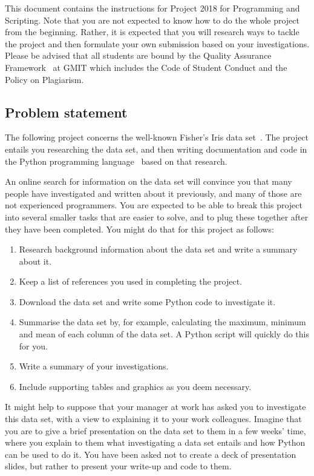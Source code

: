 \documentclass[12pt, a4paper, hidelinks]{scrartcl}
\title{\projectname}
\author{\modulename}
\date{Due: \duedate}
\newcommand{\modulename}{Programming and Scripting}
\newcommand{\projectyear}{2018}
\newcommand{\projectname}{Project \projectyear}
\begin{document}
  
\maketitle

\noindent
This document contains the instructions for \projectname{} for \modulename{}.
Note that you are not expected to know how to do the whole project from the beginning.
Rather, it is expected that you will research ways to tackle the project and then formulate your own submission based on your investigations.
Please be advised that all students are bound by the Quality Assurance Framework~\cite{gmitqaf} at GMIT which includes the Code of Student Conduct and the Policy on Plagiarism.

\subsection*{Problem statement}
  The following project concerns the well-known Fisher's Iris data set~\cite{irisdataset}.
  The project entails you researching the data set, and then writing documentation and code in the Python programming language~\cite{pythonwebsite} based on that research.
  
  An online search for information on the data set will convince you that many people have investigated and written about it previously, and many of those are not experienced programmers.
  You are expected to be able to break this project into several smaller tasks that are easier to solve, and to plug these together after they have been completed.
  You might do that for this project as follows:
  \begin{enumerate}
    \item Research background information about the data set and write a summary about it.
    \item Keep a list of references you used in completing the project.
    \item Download the data set and write some Python code to investigate it.
    \item Summarise the data set by, for example, calculating the maximum, minimum and mean of each column of the data set. A Python script will quickly do this for you.
    \item Write a summary of your investigations.
    \item Include supporting tables and graphics as you deem necessary.
  \end{enumerate}

  It might help to suppose that your manager at work has asked you to investigate this data set, with a view to explaining it to your work colleagues.
  Imagine that you are to give a brief presentation on the data set to them in a few weeks' time, where you explain to them what investigating a data set entails and how Python can be used to do it.
  You have been asked not to create a deck of presentation slides, but rather to present your write-up and code to them.
\end{document}
